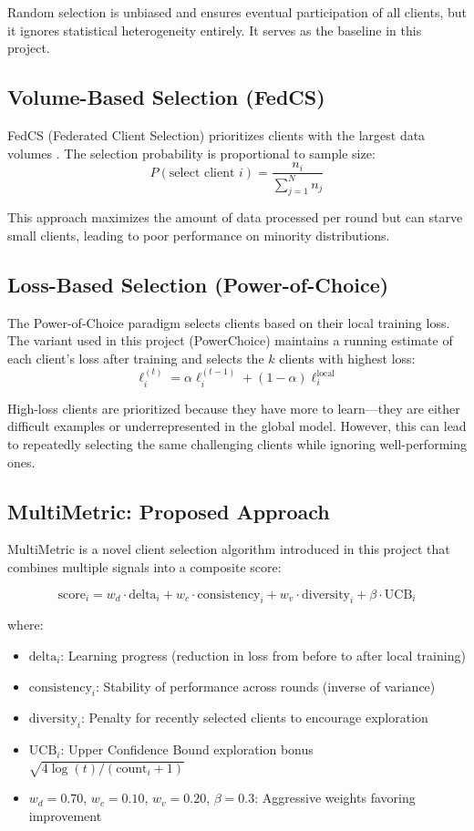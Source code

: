 Random selection is unbiased and ensures eventual participation of all clients, but it ignores statistical heterogeneity entirely. It serves as the baseline in this project.

\subsection{Volume-Based Selection (FedCS)}

FedCS (Federated Client Selection) prioritizes clients with the largest data volumes \citep{nishio2019client}. The selection probability is proportional to sample size:
\[
P(\text{select client } i) = \frac{n_i}{\sum_{j=1}^{N} n_j}
\]

This approach maximizes the amount of data processed per round but can starve small clients, leading to poor performance on minority distributions.

\subsection{Loss-Based Selection (Power-of-Choice)}

The Power-of-Choice paradigm \citep{mitzenmacher2001power} selects clients based on their local training loss. The variant used in this project (PowerChoice) maintains a running estimate of each client's loss after training and selects the \(k\) clients with highest loss:
\[
\ell_i^{(t)} = \alpha \ell_i^{(t-1)} + (1-\alpha) \ell_i^{\text{local}}
\]

High-loss clients are prioritized because they have more to learn—they are either difficult examples or underrepresented in the global model. However, this can lead to repeatedly selecting the same challenging clients while ignoring well-performing ones.

\subsection{MultiMetric: Proposed Approach}

MultiMetric is a novel client selection algorithm introduced in this project that combines multiple signals into a composite score:

\[
\text{score}_i = w_d \cdot \text{delta}_i + w_c \cdot \text{consistency}_i + w_v \cdot \text{diversity}_i + \beta \cdot \text{UCB}_i
\]

where:

\begin{itemize}
    \item \(\text{delta}_i\): Learning progress (reduction in loss from before to after local training)
    \item \(\text{consistency}_i\): Stability of performance across rounds (inverse of variance)
    \item \(\text{diversity}_i\): Penalty for recently selected clients to encourage exploration
    \item \(\text{UCB}_i\): Upper Confidence Bound exploration bonus \(\sqrt{4 \log(t) / (\text{count}_i + 1)}\)
    \item \(w_d = 0.70\), \(w_c = 0.10\), \(w_v = 0.20\), \(\beta = 0.3\): Aggressive weights favoring improvement
\end{itemize}

